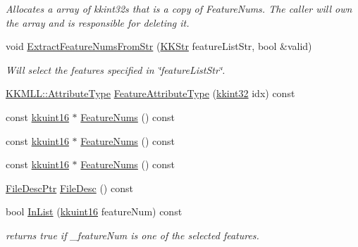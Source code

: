 \begin{DoxyCompactItemize}
\begin{DoxyCompactList}\small\item\em Allocates a array of kkint32\textquotesingle{}s that is a copy of Feature\+Nums. The caller will own the array and is responsible for deleting it. \end{DoxyCompactList}\item 
void \hyperlink{class_k_k_m_l_l_1_1_feature_num_list_af027956f522d5b169b9d377feea79053}{Extract\+Feature\+Nums\+From\+Str} (\hyperlink{class_k_k_b_1_1_k_k_str}{K\+K\+Str} feature\+List\+Str, bool \&valid)
\begin{DoxyCompactList}\small\item\em Will select the features specified in \char`\"{}feature\+List\+Str\char`\"{}. \end{DoxyCompactList}\item 
\hyperlink{namespace_k_k_m_l_l_a99973706982b59debba670e2480555ab}{K\+K\+M\+L\+L\+::\+Attribute\+Type} \hyperlink{class_k_k_m_l_l_1_1_feature_num_list_aacd67ce4831be30d4ed407285eae6122}{Feature\+Attribute\+Type} (\hyperlink{namespace_k_k_b_a8fa4952cc84fda1de4bec1fbdd8d5b1b}{kkint32} idx) const 
\item 
const \hyperlink{namespace_k_k_b_aa8c7d4d30381c8a0b6fce68974a9c8a9}{kkuint16} $\ast$ \hyperlink{class_k_k_m_l_l_1_1_feature_num_list_a249bbedb0813871d41f56da6e8f934d8}{Feature\+Nums} () const 
\item 
const \hyperlink{namespace_k_k_b_aa8c7d4d30381c8a0b6fce68974a9c8a9}{kkuint16} $\ast$ \hyperlink{class_k_k_m_l_l_1_1_feature_num_list_a249bbedb0813871d41f56da6e8f934d8}{Feature\+Nums} () const 
\item 
const \hyperlink{namespace_k_k_b_aa8c7d4d30381c8a0b6fce68974a9c8a9}{kkuint16} $\ast$ \hyperlink{class_k_k_m_l_l_1_1_feature_num_list_a249bbedb0813871d41f56da6e8f934d8}{Feature\+Nums} () const 
\item 
\hyperlink{namespace_k_k_m_l_l_aa0d0b6ab4ec18868a399b8455b05d914}{File\+Desc\+Ptr} \hyperlink{class_k_k_m_l_l_1_1_feature_num_list_a8c887df1129ad7d3119c33549373b478}{File\+Desc} () const 
\item 
bool \hyperlink{class_k_k_m_l_l_1_1_feature_num_list_a9fd41e0a953af6698d2e47b35a328095}{In\+List} (\hyperlink{namespace_k_k_b_aa8c7d4d30381c8a0b6fce68974a9c8a9}{kkuint16} feature\+Num) const 
\begin{DoxyCompactList}\small\item\em returns true if \textquotesingle{}\+\_\+feature\+Num\textquotesingle{} is one of the selected features. \end{DoxyCompactList}\item 

\end{DoxyCompactItemize}
